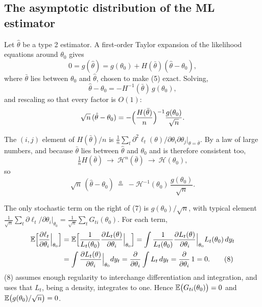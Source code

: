 \documentclass[11pt]{article}
\begin{document}
\subsection{The asymptotic distribution of the ML estimator}

Let $\hat\theta$ be a type 2 estimator. A first-order Taylor expansion of the
likelihood equations around $\theta_{0}$ gives
\begin{equation}\tag{5}
 0=g(\hat\theta)=g(\theta_{0})+H(\bar\theta)(\hat\theta-\theta_{0}),
\end{equation}
where $\bar\theta$ lies between $\theta_{0}$ and $\hat\theta$, chosen to make (5) exact. Solving,
\begin{equation}\tag{6}
 \hat\theta-\theta_{0}=-H^{-1}(\bar\theta)\,g(\theta_{0}),
\end{equation}
and rescaling so that every factor is $O(1)$:
\[ \sqrt n\,(\hat\theta-\theta_{0})=-\Bigl(\frac{H(\bar\theta)}{n}\Bigr)^{-1}\frac{g(\theta_{0})}{\sqrt n}. \]

The $(i,j)$ element of $H(\bar\theta)/n$ is
$\frac1n\sum_{t}\partial^{2}\ell_{t}(\theta)/\partial\theta_{i}\partial\theta_{j}\big|_{\theta=\bar\theta}$. By a law of large numbers,
and because $\bar\theta$ lies between $\hat\theta$ and $\theta_{0}$ and is therefore consistent too,
\[ \tfrac1nH(\bar\theta)\ \longrightarrow\ \mathcal H^{n}(\bar\theta)\ \longrightarrow\ \mathcal H(\theta_{0}), \]
so
\begin{equation}\tag{7}
 \sqrt n\,(\hat\theta-\theta_{0})\ \overset{a}{=}\ -\mathcal H^{-1}(\theta_{0})\,\frac{g(\theta_{0})}{\sqrt n}.
\end{equation}

The only stochastic term on the right of (7) is $g(\theta_{0})/\sqrt n$, with typical element
$\frac1{\sqrt n}\sum_{t}\partial\ell_{t}/\partial\theta_{i}\big|_{\theta_{0}}=\frac1{\sqrt n}\sum_{t}G_{ti}(\theta_{0})$.
For each term,
\begin{align*}
 \mathbb{E}\Bigl[\frac{\partial\ell_{t}}{\partial\theta_{i}}\Big|_{\theta_{0}}\Bigr]
 &=\mathbb{E}\Bigl[\frac{1}{L_{t}(\theta_{0})}\frac{\partial L_{t}(\theta)}{\partial\theta_{i}}\Big|_{\theta_{0}}\Bigr]
  =\int\frac{1}{L_{t}(\theta_{0})}\frac{\partial L_{t}(\theta)}{\partial\theta_{i}}\Big|_{\theta_{0}}L_{t}(\theta_{0})\,dy_{t}\\
 &=\int\frac{\partial L_{t}(\theta)}{\partial\theta_{i}}\Big|_{\theta_{0}}dy_{t}
  =\frac{\partial}{\partial\theta_{i}}\int L_{t}\,dy_{t}=\frac{\partial}{\partial\theta_{i}}\,1=0. \tag{8}
\end{align*}
(8) assumes enough regularity to interchange differentiation and integration, and uses
that $L_{t}$, being a density, integrates to one. Hence $\mathbb{E}\bigl(G_{ti}(\theta_{0})\bigr)=0$ and
$\mathbb{E}\bigl(g(\theta_{0})/\sqrt n\bigr)=0$.
\end{document}
